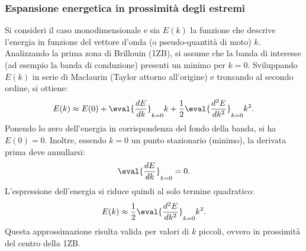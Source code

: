 \documentclass[a4paper,11pt]{report}
\begin{document}
\subsubsection{Espansione energetica in prossimità degli estremi}
Si consideri il caso monodimensionale e sia $E(k)$ la funzione che descrive l'energia in funzione del vettore d'onda (o pseudo-quantità di moto) $k$. Analizzando la prima zona di Brillouin (1ZB), si assume che la banda di interesse (ad esempio la banda di conduzione) presenti un minimo per $k = 0$.
Sviluppando $E(k)$ in serie di Maclaurin (Taylor attorno all'origine) e troncando al secondo ordine, si ottiene:
\begin{equation}
    E(k) \approx E(0) + \eval{\frac{d E}{d k}}_{k = 0}k + \frac{1}{2}\eval{\frac{d^2 E}{d k^2}}_{k = 0}k^2.
\end{equation}
Ponendo lo zero dell'energia in corrispondenza del fondo della banda, si ha $E(0) = 0$. Inoltre, essendo $k=0$ un punto stazionario (minimo), la derivata prima deve annullarsi:
\begin{equation}
    \eval{\frac{d E}{d k}}_{k = 0} = 0.
\end{equation}
L'espressione dell'energia si riduce quindi al solo termine quadratico:
\begin{equation}
    E(k) \approx \frac{1}{2}\eval{\frac{d^2 E}{d k^2}}_{k = 0}k^2.
    \label{eq:parabolic_approx}
\end{equation}
Questa approssimazione risulta valida per valori di $k$ piccoli, ovvero in prossimità del centro della 1ZB.
\end{document}
